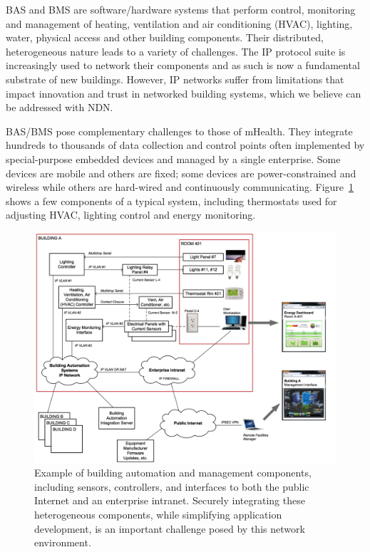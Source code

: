 BAS and BMS are software/hardware systems that perform control, monitoring and management of heating, ventilation and air conditioning (HVAC), lighting, water, physical access and other building components. Their distributed, heterogeneous nature leads to a variety of challenges.  The IP protocol suite is increasingly used to network their components and as such is now a fundamental substrate of new buildings. However, IP networks suffer from limitations that impact innovation and trust in networked building systems, which we believe can be addressed with NDN.    
 
BAS/BMS pose complementary challenges to those of mHealth. They integrate hundreds to thousands of data collection and control points often implemented by special-purpose embedded devices and managed by a single enterprise.  Some devices are mobile and others are fixed; some devices are power-constrained and wireless while others are hard-wired and continuously communicating. Figure~\ref{fig:BAS} shows a few components of a typical system, including thermostats used for adjusting HVAC, lighting control and energy monitoring. 

\begin{figure}
\begin{center}
\includegraphics[width=.6\textwidth]{figures/BAS-Figure}
\caption{{Example of building automation and management components, including sensors, controllers, and interfaces to both the public Internet and an enterprise intranet.  Securely integrating these heterogeneous components, while simplifying application development, is an important challenge posed by this network environment.}}
\label{fig:BAS}
\end{center}
\end{figure}

